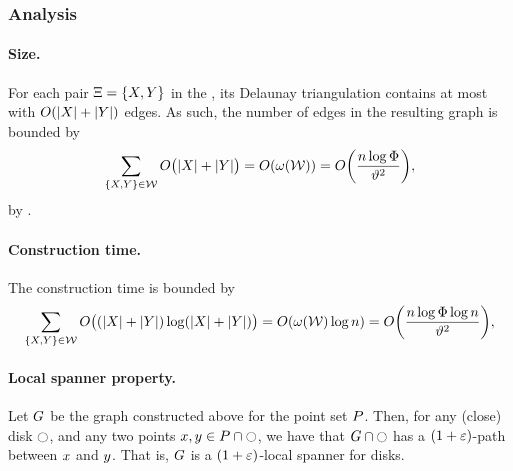 \documentclass[12pt]{article}%
\begin{document}
\subsubsection{Analysis}

\paragraph{Size.}

For each pair $\Xi = \{X, Y\}$ in the \WSPD, its Delaunay
triangulation contains at most with $O( |X| + |Y|)$ edges. As
such, the number of edges in the resulting graph is bounded by
\begin{equation*}
    \sum_{\{\PSX, \PSY\} \in \WS} O\bigl( |\PSX| + |\PSY| \bigr)
    =%
    O\pth{ \WeightX{\WS} }%
    =%
    O\pth{ \frac{n\log \spread}{{\epsA}^{2}}},
\end{equation*}
by .


\paragraph{Construction time.}
The construction time is bounded by
\begin{equation*}
    \sum_{\{\PSX, \PSY\} \in \WS} O\bigl( (|\PSX| + |\PSY|) \log
    (|\PSX| + |\PSY|)  \bigr)
    =%
    O\pth{ \WeightX{\WS} \log n }%
    =%
    O\pth{ \frac{n\log \spread \log n}{{\epsA}^{2}}},    
\end{equation*}

\paragraph{Local spanner property.}

\begin{lemma}
    Let $G$ be the graph constructed above for the point set
    $P$. Then, for any (close) disk $\ocircle$, and any two points
    $x, y \in P \cap \ocircle$, we have that
    $G \cap {\ocircle}$ has a $(1+\varepsilon)$-path between $x$ and
    $y$. That is, $G$ is a $(1+\varepsilon)$-local spanner for disks.
\end{lemma}
\end{document}
